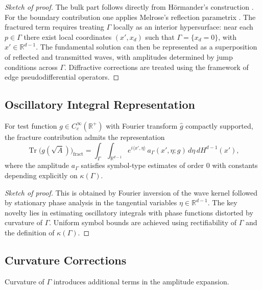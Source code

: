 \begin{proof}[Sketch of proof]
The bulk part follows directly from Hörmander's construction \cite{Hormander1971}. 
For the boundary contribution one applies Melrose's reflection parametrix \cite{Melrose1995}. 
The fractured term requires treating $\Gamma$ locally as an interior hypersurface: near each $p \in \Gamma$ there exist local coordinates $(x',x_d)$ such that $\Gamma = \{x_d=0\}$, with $x' \in \mathbb{R}^{d-1}$. 
The fundamental solution can then be represented as a superposition of reflected and transmitted waves, with amplitudes determined by jump conditions across $\Gamma$. 
Diffractive corrections are treated using the framework of edge pseudodifferential operators. 
\end{proof}

\subsection{Oscillatory Integral Representation}

\begin{theorem}
\label{thm:fracture-oscillatory}
For test function $g \in C_c^\infty(\mathbb{R}^+)$ with Fourier transform $\hat{g}$ compactly supported, the fracture contribution admits the representation
\[
\operatorname{Tr}\big( g(\sqrt{A}) \big)_{\mathrm{fract}} 
= \int_\Gamma \int_{\mathbb{R}^{d-1}} e^{i \langle x',\eta\rangle}\, a_\Gamma(x',\eta;g)\, d\eta\, dH^{d-1}(x'),
\]
where the amplitude $a_\Gamma$ satisfies symbol-type estimates of order $0$ with constants depending explicitly on $\kappa(\Gamma)$. 
\end{theorem}

\begin{proof}[Sketch of proof]
This is obtained by Fourier inversion of the wave kernel followed by stationary phase analysis in the tangential variables $\eta \in \mathbb{R}^{d-1}$. 
The key novelty lies in estimating oscillatory integrals with phase functions distorted by curvature of $\Gamma$. 
Uniform symbol bounds are achieved using rectifiability of $\Gamma$ and the definition of $\kappa(\Gamma)$. 
\end{proof}

\subsection{Curvature Corrections}

Curvature of $\Gamma$ introduces additional terms in the amplitude expansion. 

